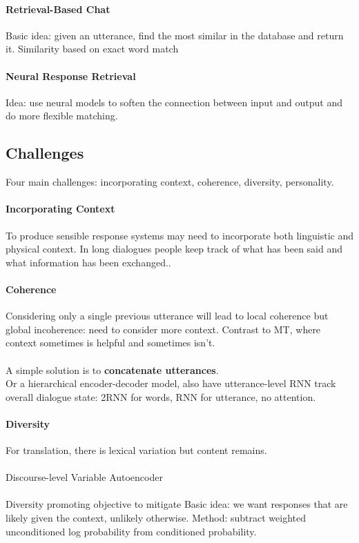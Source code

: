 \documentclass[10pt]{report}
\begin{document}
\paragraph{Retrieval-Based Chat} Basic idea: given an utterance, find the most similar in the database and return it. Similarity based on exact word match %
\paragraph{Neural Response Retrieval} Idea: use neural models to soften the connection between input and output and do more flexible matching.
\subsection{Challenges}
Four main challenges: incorporating context, coherence, diversity, personality.
\paragraph{Incorporating Context} To produce sensible response systems may need to incorporate both linguistic and physical context. In long dialogues people keep track of what has been said and what information has been exchanged..
\paragraph{Coherence} Considering only a single previous utterance will lead to local coherence but global incoherence: need to consider more context. Contrast to MT, where context sometimes is helpful and sometimes isn't.\\\\
A simple solution is to \textbf{concatenate utterances}.\\
Or a hierarchical encoder-decoder model, also have utterance-level RNN track overall dialogue state: 2RNN for words, RNN for utterance, no attention.
\paragraph{Diversity} For translation, there is lexical variation but content remains.\\\\
Discourse-level Variable Autoencoder\\\\ %
Diversity promoting objective to mitigate %
Basic idea: we want responses that are likely given the context, unlikely otherwise. Method: subtract weighted unconditioned log probability from conditioned probability.
\end{document}
